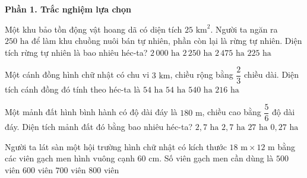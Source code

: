 \textbf{Phần 1. Trắc nghiệm lựa chọn}

\begin{ex} %
Một khu bảo tồn động vật hoang dã có diện tích $25\text{ km}^2$. Người ta ngăn ra $250\text{ ha}$ để làm khu chuồng nuôi bán tự nhiên, phần còn lại là rừng tự nhiên. Diện tích rừng tự nhiên là bao nhiêu héc-ta?
\choice
{$2\,000\text{ ha}$}
{\True $2\,250\text{ ha}$}
{$2\,475\text{ ha}$}
{$225\text{ ha}$}
\end{ex}

\begin{ex} %
Một cánh đồng hình chữ nhật có chu vi $3\text{ km}$, chiều rộng bằng $\dfrac{2}{3}$ chiều dài. Diện tích cánh đồng đó tính theo héc-ta là
\choice
{$54\text{ ha}$}
{\True $54\text{ ha}$}
{$540\text{ ha}$}
{$216\text{ ha}$}
\end{ex}

\begin{ex} %
Một mảnh đất hình bình hành có độ dài đáy là $180\text{ m}$, chiều cao bằng $\dfrac{5}{6}$ độ dài đáy. Diện tích mảnh đất đó bằng bao nhiêu héc-ta?
\choice
{$2{,}7\text{ ha}$}
{\True $2{,}7\text{ ha}$}
{$27\text{ ha}$}
{$0{,}27\text{ ha}$}
\end{ex}

\begin{ex} %
Người ta lát sàn một hội trường hình chữ nhật có kích thước $18\text{ m} \times 12\text{ m}$ bằng các viên gạch men hình vuông cạnh $60\text{ cm}$. Số viên gạch men cần dùng là
\choice
{$500$ viên}
{\True $600$ viên}
{$700$ viên}
{$800$ viên}
\end{ex}

